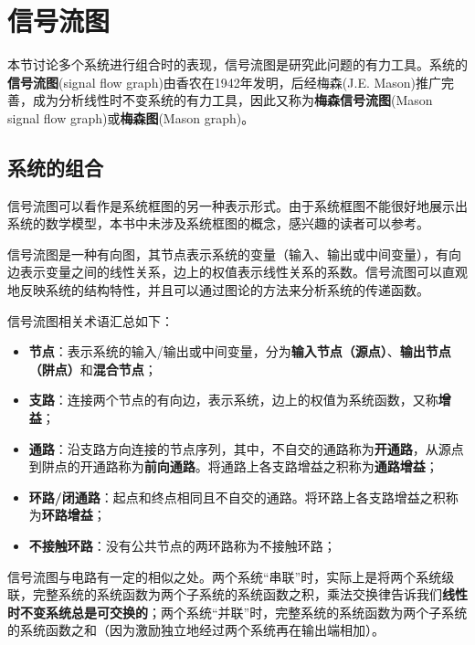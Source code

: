 \section{信号流图}\label{sec:Signal_Flow_Graph}

本节讨论多个系统进行组合时的表现，信号流图是研究此问题的有力工具。系统的\textbf{信号流图}(signal flow graph)由香农在1942年发明，后经梅森(J.E. Mason)推广完善，成为分析线性时不变系统的有力工具，因此又称为\textbf{梅森信号流图}(Mason signal flow graph)或\textbf{梅森图}(Mason graph)。

\subsection{系统的组合}\label{sub:system_comb}

信号流图可以看作是系统框图的另一种表示形式。由于系统框图不能很好地展示出系统的数学模型，本书中未涉及系统框图的概念，感兴趣的读者可以参考\cite{oppenheim1997signals}\cite{signal_systems}。

\begin{definition}
信号流图是一种有向图，其节点表示系统的变量（输入、输出或中间变量），有向边表示变量之间的线性关系，边上的权值表示线性关系的系数。信号流图可以直观地反映系统的结构特性，并且可以通过图论的方法来分析系统的传递函数。

信号流图相关术语汇总如下：\begin{itemize}
    \item \textbf{节点}：表示系统的输入/输出或中间变量，分为\textbf{输入节点（源点）}、\textbf{输出节点（阱点）}和\textbf{混合节点}；
    \item \textbf{支路}：连接两个节点的有向边，表示系统，边上的权值为系统函数，又称\textbf{增益}；
    \item \textbf{通路}：沿支路方向连接的节点序列，其中，不自交的通路称为\textbf{开通路}，从源点到阱点的开通路称为\textbf{前向通路}。将通路上各支路增益之积称为\textbf{通路增益}；
    \item \textbf{环路/闭通路}：起点和终点相同且不自交的通路。将环路上各支路增益之积称为\textbf{环路增益}；
    \item \textbf{不接触环路}：没有公共节点的两环路称为不接触环路；
\end{itemize}
\end{definition}

信号流图与电路有一定的相似之处。两个系统“串联”时，实际上是将两个系统级联，完整系统的系统函数为两个子系统的系统函数之积，乘法交换律告诉我们\textbf{线性时不变系统总是可交换的}；两个系统“并联”时，完整系统的系统函数为两个子系统的系统函数之和（因为激励独立地经过两个系统再在输出端相加）。

